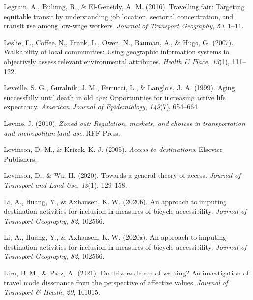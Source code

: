 \documentclass[12pt,twoside]{reedthesis}
\newlength{\cslhangindent}
\newenvironment{CSLReferences}[2] %
 {%
  \setlength{\parindent}{0pt}
  \ifodd #1 \everypar{\setlength{\hangindent}{\cslhangindent}}\ignorespaces\fi
  \ifnum #2 > 0
  \setlength{\parskip}{#2\baselineskip}
  \fi
 }%
 {}
\begin{document}
\begin{CSLReferences}{1}{0}
\leavevmode{}%
Legrain, A., Buliung, R., \& El-Geneidy, A. M. (2016). Travelling fair: Targeting equitable transit by understanding job location, sectorial concentration, and transit use among low-wage workers. \emph{Journal of Transport Geography}, \emph{53}, 1--11.

\leavevmode{}%
Leslie, E., Coffee, N., Frank, L., Owen, N., Bauman, A., \& Hugo, G. (2007). Walkability of local communities: Using geographic information systems to objectively assess relevant environmental attributes. \emph{Health \& Place}, \emph{13}(1), 111--122.

\leavevmode{}%
Leveille, S. G., Guralnik, J. M., Ferrucci, L., \& Langlois, J. A. (1999). Aging successfully until death in old age: Opportunities for increasing active life expectancy. \emph{American Journal of Epidemiology}, \emph{149}(7), 654--664.

\leavevmode{}%
Levine, J. (2010). \emph{Zoned out: Regulation, markets, and choices in transportation and metropolitan land use}. RFF Press.

\leavevmode{}%
Levinson, D. M., \& Krizek, K. J. (2005). \emph{Access to destinations}. Elsevier Publishers.

\leavevmode{}%
Levinson, D., \& Wu, H. (2020). Towards a general theory of access. \emph{Journal of Transport and Land Use}, \emph{13}(1), 129--158.

\leavevmode{}%
Li, A., Huang, Y., \& Axhausen, K. W. (2020b). An approach to imputing destination activities for inclusion in measures of bicycle accessibility. \emph{Journal of Transport Geography}, \emph{82}, 102566.

\leavevmode{}%
Li, A., Huang, Y., \& Axhausen, K. W. (2020a). An approach to imputing destination activities for inclusion in measures of bicycle accessibility. \emph{Journal of Transport Geography}, \emph{82}, 102566.

\leavevmode{}%
Lira, B. M., \& Paez, A. (2021). Do drivers dream of walking? An investigation of travel mode dissonance from the perspective of affective values. \emph{Journal of Transport \& Health}, \emph{20}, 101015.


\end{CSLReferences}
\end{document}
